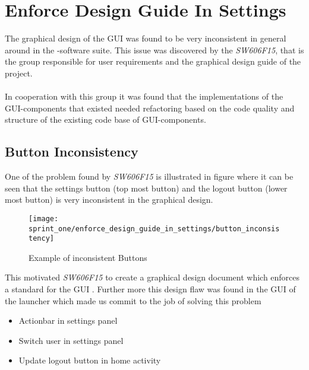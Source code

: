 \section{Enforce Design Guide In Settings}
\label{sec:enforce_design_guide_in_settings}

The graphical design of the GUI was found to be very inconsistent in general around in the \giraf-software suite. This issue was discovered by the \emph{SW606F15}, that is the group responsible for user requirements and the graphical design guide of the project.
\\\\
In cooperation with this group it was found that the implementations of the GUI-components that existed needed refactoring based on the code quality and structure of the existing code base of GUI-components.

\subsection{Button Inconsistency}
\label{sub:button_inconsistency}
One of the problem found by \emph{SW606F15} is illustrated in figure  where it can be seen that the settings button (top most button) and the logout button (lower most button) is very inconsistent in the graphical design. 

\begin{figure}[!htbp]
    \centering
    \texttt{[image: sprint\_one/enforce\_design\_guide\_in\_settings/button\_inconsistency]}
    \caption{Example of inconsistent Buttons}
    \label{fig:button_inconsistency}
\end{figure}

This motivated \emph{SW606F15} to create a graphical design document which enforces a standard for the GUI . Further more this design flaw was found in the GUI of the launcher which made us commit to the job of solving this problem



\begin{itemize}
	\item Actionbar in settings panel
	\item Switch user in settings panel
	\item Update logout button in home activity
\end{itemize}